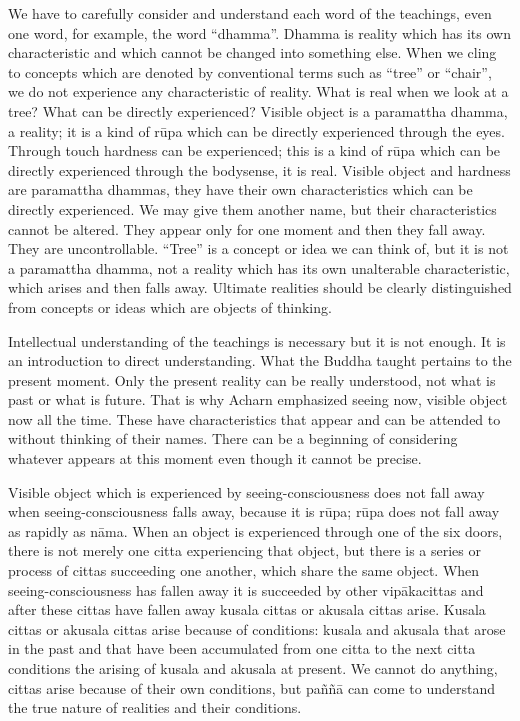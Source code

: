 We have to carefully consider and understand each word of the teachings,
even one word, for example, the word ``dhamma''. Dhamma is reality which
has its own characteristic and which cannot be changed into something
else. When we cling to concepts which are denoted by conventional terms
such as ``tree'' or ``chair'', we do not experience any characteristic
of reality. What is real when we look at a tree? What can be directly
experienced? Visible object is a paramattha dhamma, a reality; it is a
kind of rūpa which can be directly experienced through the eyes. Through
touch hardness can be experienced; this is a kind of rūpa which can be
directly experienced through the bodysense, it is real. Visible object
and hardness are paramattha dhammas, they have their own characteristics
which can be directly experienced. We may give them another name, but
their characteristics cannot be altered. They appear only for one moment
and then they fall away. They are uncontrollable. ``Tree'' is a concept
or idea we can think of, but it is not a paramattha dhamma, not a
reality which has its own unalterable characteristic, which arises and
then falls away. Ultimate realities should be clearly distinguished from
concepts or ideas which are objects of thinking.

Intellectual understanding of the teachings is necessary but it is not
enough. It is an introduction to direct understanding. What the Buddha
taught pertains to the present moment. Only the present reality can be
really understood, not what is past or what is future. That is why
Acharn emphasized seeing now, visible object now all the time. These
have characteristics that appear and can be attended to without thinking
of their names. There can be a beginning of considering whatever appears
at this moment even though it cannot be precise.

Visible object which is experienced by seeing-consciousness does not
fall away when seeing-consciousness falls away, because it is rūpa; rūpa
does not fall away as rapidly as nāma. When an object is experienced
through one of the six doors, there is not merely one citta experiencing
that object, but there is a series or process of cittas succeeding one
another, which share the same object. When seeing-consciousness has
fallen away it is succeeded by other vipākacittas and after these cittas
have fallen away kusala cittas or akusala cittas arise. Kusala cittas or
akusala cittas arise because of conditions: kusala and akusala that
arose in the past and that have been accumulated from one citta to the
next citta conditions the arising of kusala and akusala at present. We
cannot do anything, cittas arise because of their own conditions, but
paññā can come to understand the true nature of realities and their
conditions.

